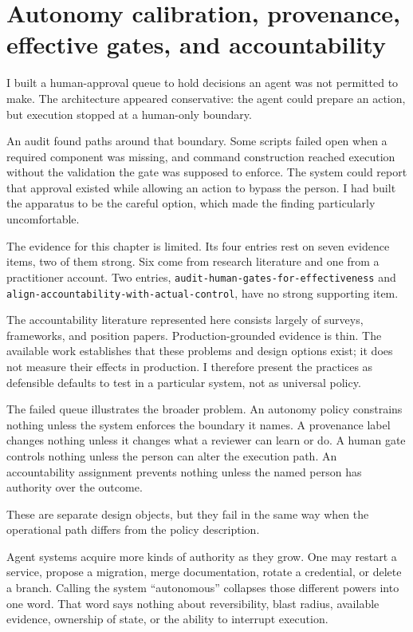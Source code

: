 \chapter{Autonomy calibration, provenance, effective gates, and accountability}
\label{ch16-autonomy-provenance-gates-accountability}
I built a human-approval queue to hold decisions an agent was not permitted to make. The architecture appeared conservative: the agent could prepare an action, but execution stopped at a human-only boundary.

An audit found paths around that boundary. Some scripts failed open when a required component was missing, and command construction reached execution without the validation the gate was supposed to enforce. The system could report that approval existed while allowing an action to bypass the person. I had built the apparatus to be the careful option, which made the finding particularly uncomfortable.

The evidence for this chapter is limited. Its four entries rest on seven evidence items, two of them strong. Six come from research literature and one from a practitioner account. Two entries, \texttt{audit-human-gates-for-effectiveness} and \texttt{align-accountability-with-actual-control}, have no strong supporting item.

The accountability literature represented here consists largely of surveys, frameworks, and position papers. Production-grounded evidence is thin. The available work establishes that these problems and design options exist; it does not measure their effects in production. I therefore present the practices as defensible defaults to test in a particular system, not as universal policy.

The failed queue illustrates the broader problem. An autonomy policy constrains nothing unless the system enforces the boundary it names. A provenance label changes nothing unless it changes what a reviewer can learn or do. A human gate controls nothing unless the person can alter the execution path. An accountability assignment prevents nothing unless the named person has authority over the outcome.

These are separate design objects, but they fail in the same way when the operational path differs from the policy description.

Agent systems acquire more kinds of authority as they grow. One may restart a service, propose a migration, merge documentation, rotate a credential, or delete a branch. Calling the system ``autonomous'' collapses those different powers into one word. That word says nothing about reversibility, blast radius, available evidence, ownership of state, or the ability to interrupt execution.


